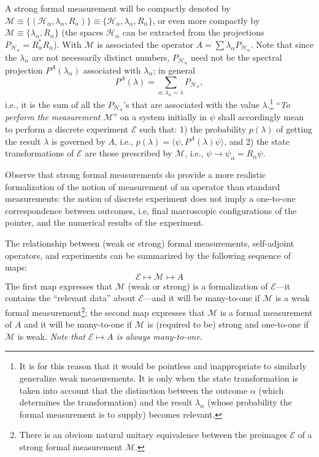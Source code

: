 \documentclass[12pt]{article}
\newcommand{\sa}{self-adjoint}
\renewcommand{\a}{\alpha}
\newcommand{\la}{\lambda_{\a}}
\newcommand{\psia}{\psi_{\a}}
\newcommand{\Ha}{{\H}_{\a}}
\renewcommand{\H}{\mbox{$\mathcal{H}$}}
\newcommand{\Pa}{ P_{ {\mathcal{H}_{\a} } } }
\newcommand{\Aa}{R_{\a}}
\newcommand{\E}{\mbox{$\mathscr{E}$}}
\newcommand{\M}{\mbox{$\mathcal{M}$}}
\begin{document}
A strong formal measurement will be compactly denoted by $\M\equiv
\{(\Ha, \la, \Aa) \}\equiv\{\Ha, \la, \Aa \}$, or even more compactly
by $\M\equiv \{\la, \Aa \}$ (the spaces $\Ha$ can be extracted {}from
the projections $\Pa= \Aa^{\ast}\Aa$).  With \M{} is associated the
operator $A=\sum\la\Pa$.  Note that since the $\la$ are not
necessarily distinct numbers, $\Pa$ need not be the spectral
projection $P^A (\la)$ associated with $\la$; in general $$P^A
(\lambda) = \sum_{\a: \la =\lambda}\Pa,$$
i.e., it is the sum of all
the $\Pa$'s that are associated with the value $\lambda$.\footnote{ It
   is for this reason that it would be pointless and inappropriate to
   similarly generalize weak measurements. It is only when the state
   transformation is taken into account that the distinction between
   the outcome $\a$ (which determines the transformation) and the
   result $\la$ (whose probability the formal measurement is to supply)
   becomes relevant.}  ``\emph{To perform the measurement $\M$}'' on a
system initially in $\psi$ shall accordingly mean to perform a
discrete experiment \E{} such that: 1) the probability $p(\lambda)$ of
getting the result $\lambda$ is governed by $A$, i.e., $ p(\lambda) =
\langle \psi, P^A (\lambda) \psi \rangle$, and 2) the state
transformations of \E{} are those prescribed by \M{}, i.e., $ \psi \to
\psia= \Aa\psi$.


Observe that strong formal measurements do provide a more realistic
formalization of the notion of measurement of an operator than
standard measurements: the notion of discrete experiment does not
imply a one-to-one correspondence between outcomes, i.e, final
macroscopic configurations of the pointer, and the numerical results
of the experiment.



The relationship between (weak or strong) formal measurements, \sa{}
operators, and experiments can be summarized by the following sequence
of maps:
\begin{equation}
\E \mapsto \M \mapsto A
\label{eq:etomtoa}
\end{equation}
The first map expresses that $\M$ (weak or strong) is a formalization
of \E{}---it contains the ``relevant data'' about \E{}---and it will
be many-to-one if \M{} is a weak formal measurement\footnote{There is
   an obvious natural unitary equivalence between the preimages \E{} of
   a strong formal measurement \M{}.}; the second map expresses that
\M{} is a formal measurement of $A$ and it will be many-to-one if \M{}
is (required to be) strong and one-to-one if \M{} is weak.  \emph{Note
   that $\E\mapsto A$ is always many-to-one}.
\end{document}
